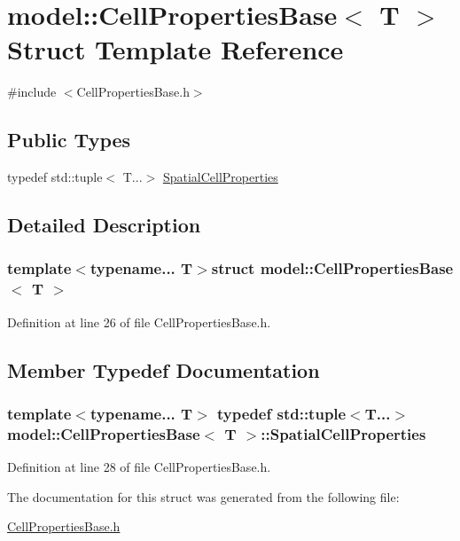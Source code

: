 \hypertarget{structmodel_1_1_cell_properties_base}{}\section{model\+:\+:Cell\+Properties\+Base$<$ T $>$ Struct Template Reference}
\label{structmodel_1_1_cell_properties_base}


{\ttfamily \#include $<$Cell\+Properties\+Base.\+h$>$}

\subsection*{Public Types}
\begin{DoxyCompactItemize}
\item 
typedef std\+::tuple$<$ T...$>$ \hyperlink{structmodel_1_1_cell_properties_base_a78639859408d4df5b219a09356a39fa8}{Spatial\+Cell\+Properties}
\end{DoxyCompactItemize}


\subsection{Detailed Description}
\subsubsection*{template$<$typename... T$>$struct model\+::\+Cell\+Properties\+Base$<$ T $>$}



Definition at line 26 of file Cell\+Properties\+Base.\+h.



\subsection{Member Typedef Documentation}
\hypertarget{structmodel_1_1_cell_properties_base_a78639859408d4df5b219a09356a39fa8}{}
\subsubsection[{Spatial\+Cell\+Properties}]{\setlength{\rightskip}{0pt plus 5cm}template$<$typename... T$>$ typedef std\+::tuple$<$T...$>$ {\bf model\+::\+Cell\+Properties\+Base}$<$ {\bf T} $>$\+::{\bf Spatial\+Cell\+Properties}}\label{structmodel_1_1_cell_properties_base_a78639859408d4df5b219a09356a39fa8}


Definition at line 28 of file Cell\+Properties\+Base.\+h.



The documentation for this struct was generated from the following file\+:\begin{DoxyCompactItemize}
\item 
\hyperlink{_cell_properties_base_8h}{Cell\+Properties\+Base.\+h}\end{DoxyCompactItemize}
